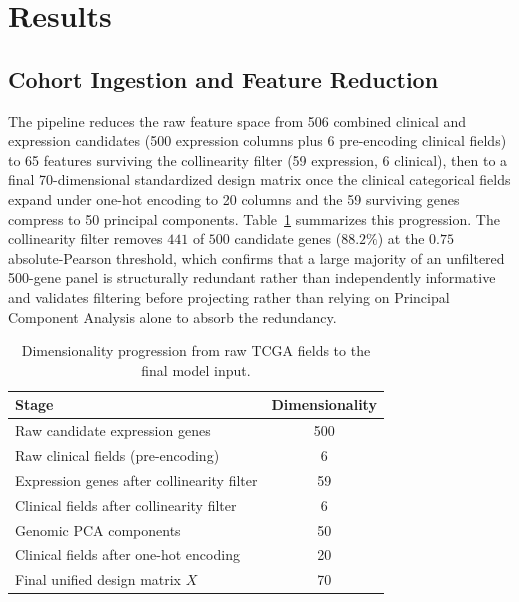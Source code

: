 \documentclass[sigconf, review=true]{acmart}
\begin{document}
\section{Results}

\subsection{Cohort Ingestion and Feature Reduction}
The pipeline reduces the raw feature space from 506 combined clinical and expression candidates (500 expression columns plus 6 pre-encoding clinical fields) to 65 features surviving the collinearity filter (59 expression, 6 clinical), then to a final 70-dimensional standardized design matrix once the clinical categorical fields expand under one-hot encoding to 20 columns and the 59 surviving genes compress to 50 principal components. Table~\ref{tab:dim_progression} summarizes this progression. The collinearity filter removes $441$ of $500$ candidate genes ($88.2\%$) at the $0.75$ absolute-Pearson threshold, which confirms that a large majority of an unfiltered 500-gene panel is structurally redundant rather than independently informative and validates filtering before projecting rather than relying on Principal Component Analysis alone to absorb the redundancy.

\begin{table}[t]
  \caption{Dimensionality progression from raw TCGA fields to the final model input.}
  \label{tab:dim_progression}
  \begin{tabular}{lc}
    \toprule
    Stage & Dimensionality \\
    \midrule
    Raw candidate expression genes & 500 \\
    Raw clinical fields (pre-encoding) & 6 \\
    Expression genes after collinearity filter & 59 \\
    Clinical fields after collinearity filter & 6 \\
    Genomic PCA components & 50 \\
    Clinical fields after one-hot encoding & 20 \\
    Final unified design matrix $X$ & 70 \\
  \bottomrule
\end{tabular}
\end{table}
\end{document}
